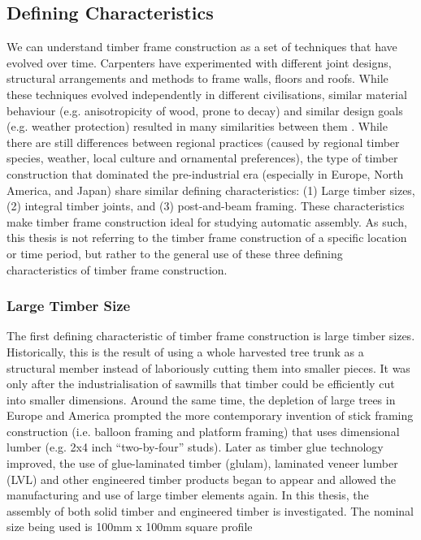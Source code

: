 \subsection{Defining Characteristics}
\label{subsection:introduction-defining-characteristics}

We can understand timber frame construction as a set of techniques that have evolved over time. Carpenters have experimented with different joint designs, structural arrangements and methods to frame walls, floors and roofs. While these techniques evolved independently in different civilisations, similar material behaviour (e.g. anisotropicity of wood, prone to decay) and similar design goals (e.g. weather protection) resulted in many similarities between them \parencite{zwergerWoodWoodJoints2012}.
While there are still differences between regional practices (caused by regional timber species, weather, local culture and ornamental preferences), the type of timber construction that dominated the pre-industrial era (especially in Europe, North America, and Japan) share similar defining characteristics: (1) Large timber sizes, (2) integral timber joints, and (3) post-and-beam framing. 
These characteristics make timber frame construction ideal for studying automatic assembly.
As such, this thesis is not referring to the timber frame construction of a specific location or time period, but rather to the general use of these three defining characteristics of timber frame construction.

\subsubsection{Large Timber Size}
\label{subsubsection:introduction-large-timber-size}

The first defining characteristic of timber frame construction is large timber sizes.
Historically, this is the result of using a whole harvested tree trunk as a structural member instead of laboriously cutting them into smaller pieces.
It was only after the industrialisation of sawmills that timber could be efficiently cut into smaller dimensions.
Around the same time, the depletion of large trees in Europe and America prompted the more contemporary invention of stick framing construction (i.e. balloon framing and platform framing) that uses dimensional lumber (e.g. 2x4 inch “two-by-four” studs). Later as timber glue technology improved, the use of glue-laminated timber (glulam), laminated veneer lumber (LVL) and other engineered timber products began to appear and allowed the manufacturing and use of large timber elements again.
In this thesis, the assembly of both solid timber and engineered timber is investigated.
The nominal size being used is 100mm x 100mm square profile 

